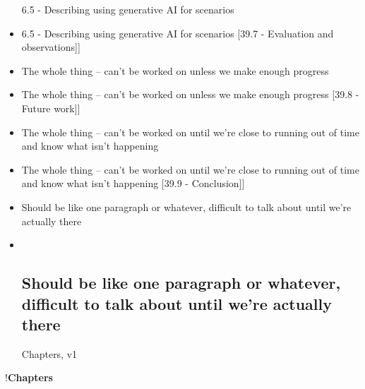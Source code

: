 \begin{itemize}
  6.5 - Describing using generative AI for scenarios
\item
  6.5 - Describing using generative AI for scenarios {[}39.7 -
  Evaluation and observations{]}{]}
\item
  The whole thing -- can't be worked on unless we make enough progress
\item
  The whole thing -- can't be worked on unless we make enough progress
  {[}39.8 - Future work{]}{]}
\item
  The whole thing -- can't be worked on until we're close to running out
  of time and know what isn't happening
\item
  The whole thing -- can't be worked on until we're close to running out
  of time and know what isn't happening {[}39.9 - Conclusion{]}{]}
\item
  Should be like one paragraph or whatever, difficult to talk about
  until we're actually there
\item ~
  \subsection{Should be like one paragraph or whatever, difficult to
  talk about until we're actually
  there}\label{should-be-like-one-paragraph-or-whatever-difficult-to-talk-about-until-were-actually-there}

  Chapters, v1
\end{itemize}

!\textbf{Chapters}
